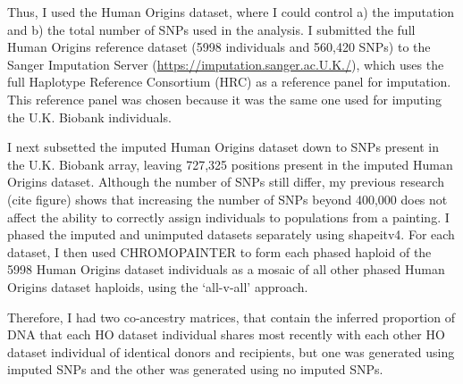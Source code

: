 Thus, I used the Human Origins dataset, where I could control a) the imputation and b) the total number of SNPs used in the analysis. I submitted the full Human Origins reference dataset (5998 individuals and 560,420 SNPs) to the Sanger Imputation Server (\url{https://imputation.sanger.ac.U.K./}), which uses the full Haplotype Reference Consortium (HRC) as a reference panel for imputation. This reference panel was chosen because it was the same one used for imputing the U.K. Biobank individuals.

I next subsetted the imputed Human Origins dataset down to SNPs present in the U.K. Biobank array, leaving 727,325 positions present in the imputed Human Origins dataset. Although the number of SNPs still differ, my previous research (cite figure) shows that increasing the number of SNPs beyond 400,000 does not affect the ability to correctly assign individuals to populations from a painting. I phased the imputed and unimputed datasets separately using shapeitv4. For each dataset, I then used CHROMOPAINTER to form each phased haploid of the 5998 Human Origins dataset individuals as a mosaic of all other phased Human Origins dataset haploids, using the `all-v-all' approach. 

Therefore, I had two co-ancestry matrices, that contain the inferred proportion of DNA that each HO dataset individual shares most recently with each other HO dataset individual of identical donors and recipients, but one was generated using imputed SNPs and the other was generated using no imputed SNPs. 

